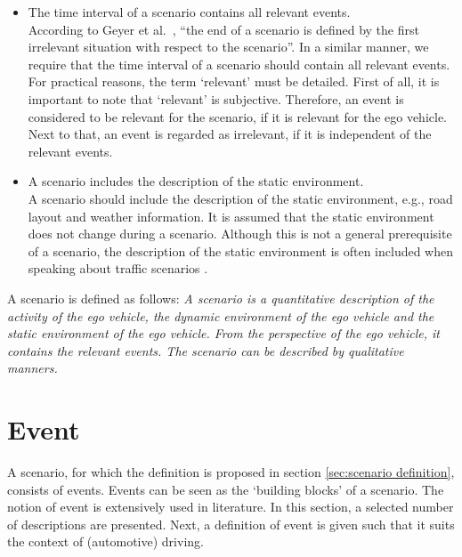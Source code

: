 \documentclass[10pt,final,a4paper,oneside,onecolumn]{article}
\begin{document}
\begin{itemize}
	\item The time interval of a scenario contains all relevant events. \\
	According to Geyer et al.\ \cite{geyer2014}, ``the end of a scenario is defined by the first irrelevant situation with respect to the scenario''. In a similar manner, we require that the time interval of a scenario should contain all relevant events. For practical reasons, the term `relevant' must be detailed. First of all, it is important to note that `relevant' is subjective. Therefore, an event is considered to be relevant for the scenario, if it is relevant for the ego vehicle. Next to that, an event is regarded as irrelevant, if it is independent of the relevant events.
	
	\item A scenario includes the description of the static environment. \\
	A scenario should include the description of the static environment, e.g., road layout and weather information. It is assumed that the static environment does not change during a scenario. Although this is not a general prerequisite of a scenario, the description of the static environment is often included when speaking about traffic scenarios \cite{geyer2014, ulbrich2015, elrofai2016scenario, hulshof2013autonomous, ebner2011identifying, schuldt2013effiziente, althoff2017CommonRoad}.
\end{itemize}

A scenario is defined as follows: \emph{A scenario is a quantitative description of the activity of the ego vehicle, the dynamic environment of the ego vehicle and the static environment of the ego vehicle. From the perspective of the ego vehicle, it contains the relevant events. The scenario can be described by qualitative manners.}

\section{Event}
\label{sec:events}
A scenario, for which the definition is proposed in section \ref{sec:scenario definition}, consists of events. Events can be seen as the `building blocks' of a scenario. The notion of event is extensively used in literature. In this section, a selected number of descriptions are presented. Next, a definition of event is given such that it suits the context of (automotive) driving.
\end{document}
